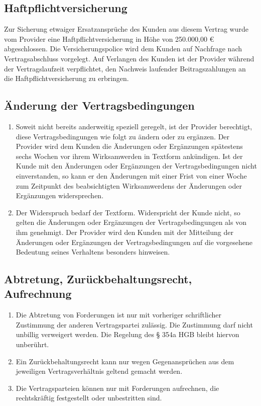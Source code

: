 \documentclass{terms}
\begin{document}
\subsection{Haftpflichtversicherung}
Zur Sicherung etwaiger Ersatzansprüche des Kunden aus diesem Vertrag wurde vom Provider eine Haftpflichtversicherung in Höhe von 250.000,00 € abgeschlossen. Die Versicherungspolice wird dem Kunden auf Nachfrage nach Vertragsabschluss vorgelegt. Auf Verlangen des Kunden ist der Provider während der Vertragslaufzeit verpflichtet, den Nachweis laufender Beitragszahlungen an die Haftpflichtversicherung zu erbringen.

\subsection{Änderung der Vertragsbedingungen}
\begin{enumerate}
\item Soweit nicht bereits anderweitig speziell geregelt, ist der Provider berechtigt, diese Vertragsbedingungen wie folgt zu ändern oder zu ergänzen. Der Provider wird dem Kunden die Änderungen oder Ergänzungen spätestens sechs Wochen vor ihrem Wirksamwerden in Textform ankündigen. Ist der Kunde mit den Änderungen oder Ergänzungen der Vertragsbedingungen nicht einverstanden, so kann er den Änderungen mit einer Frist von einer Woche zum Zeitpunkt des beabsichtigten Wirksamwerdens der Änderungen oder Ergänzungen widersprechen. 
\item Der Widerspruch bedarf der Textform. Widerspricht der Kunde nicht, so gelten die Änderungen oder Ergänzungen der Vertragsbedingungen als von ihm genehmigt. Der Provider wird den Kunden mit der Mitteilung der Änderungen oder Ergänzungen der Vertragsbedingungen auf die vorgesehene Bedeutung seines Verhaltens besonders hinweisen.
\end{enumerate}

\subsection{Abtretung, Zurückbehaltungsrecht, Aufrechnung}
\begin{enumerate}
\item Die Abtretung von Forderungen ist nur mit vorheriger schriftlicher Zustimmung der anderen Vertragspartei zulässig. Die Zustimmung darf nicht unbillig verweigert werden. Die Regelung des § 354a HGB bleibt hiervon unberührt.
\item Ein Zurückbehaltungsrecht kann nur wegen Gegenansprüchen aus dem jeweiligen Vertragsverhältnis geltend gemacht werden.
\item Die Vertragsparteien können nur mit Forderungen aufrechnen, die rechtskräftig festgestellt oder unbestritten sind.
\end{enumerate}
\end{document}
